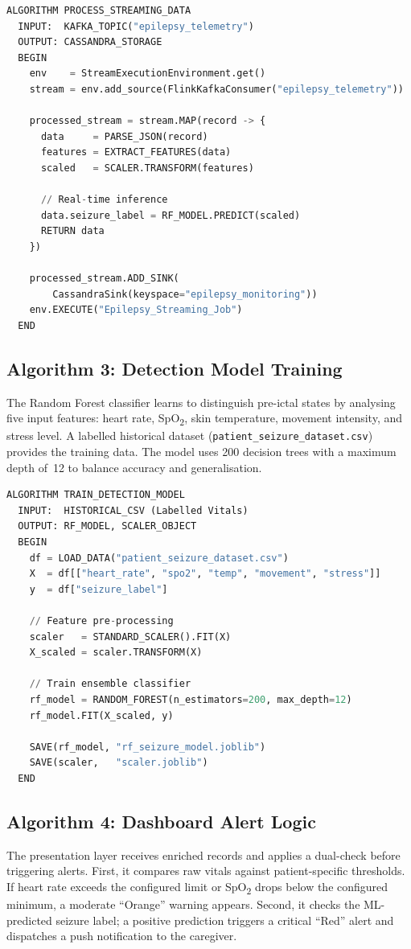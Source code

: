 \documentclass[12pt, a4paper, oneside]{report}
\begin{document}
\begin{lstlisting}[language=Python, caption=Algorithm for stateful stream transformation.]
ALGORITHM PROCESS_STREAMING_DATA
  INPUT:  KAFKA_TOPIC("epilepsy_telemetry")
  OUTPUT: CASSANDRA_STORAGE
  BEGIN
    env    = StreamExecutionEnvironment.get()
    stream = env.add_source(FlinkKafkaConsumer("epilepsy_telemetry"))

    processed_stream = stream.MAP(record -> {
      data     = PARSE_JSON(record)
      features = EXTRACT_FEATURES(data)
      scaled   = SCALER.TRANSFORM(features)

      // Real-time inference
      data.seizure_label = RF_MODEL.PREDICT(scaled)
      RETURN data
    })

    processed_stream.ADD_SINK(
        CassandraSink(keyspace="epilepsy_monitoring"))
    env.EXECUTE("Epilepsy_Streaming_Job")
  END
\end{lstlisting}

\subsection{Algorithm 3: Detection Model Training}
The Random Forest classifier learns to distinguish pre-ictal states by analysing five input features: heart rate, SpO\textsubscript{2}, skin temperature, movement intensity, and stress level. A labelled historical dataset (\texttt{patient\_seizure\_dataset.csv}) provides the training data. The model uses 200 decision trees with a maximum depth of~12 to balance accuracy and generalisation.

\begin{lstlisting}[language=Python, caption=Algorithm for detection model training.]
ALGORITHM TRAIN_DETECTION_MODEL
  INPUT:  HISTORICAL_CSV (Labelled Vitals)
  OUTPUT: RF_MODEL, SCALER_OBJECT
  BEGIN
    df = LOAD_DATA("patient_seizure_dataset.csv")
    X  = df[["heart_rate", "spo2", "temp", "movement", "stress"]]
    y  = df["seizure_label"]

    // Feature pre-processing
    scaler   = STANDARD_SCALER().FIT(X)
    X_scaled = scaler.TRANSFORM(X)

    // Train ensemble classifier
    rf_model = RANDOM_FOREST(n_estimators=200, max_depth=12)
    rf_model.FIT(X_scaled, y)

    SAVE(rf_model, "rf_seizure_model.joblib")
    SAVE(scaler,   "scaler.joblib")
  END
\end{lstlisting}

\subsection{Algorithm 4: Dashboard Alert Logic}
The presentation layer receives enriched records and applies a dual-check before triggering alerts. First, it compares raw vitals against patient-specific thresholds. If heart rate exceeds the configured limit or SpO\textsubscript{2} drops below the configured minimum, a moderate ``Orange'' warning appears. Second, it checks the ML-predicted seizure label; a positive prediction triggers a critical ``Red'' alert and dispatches a push notification to the caregiver.
\end{document}
